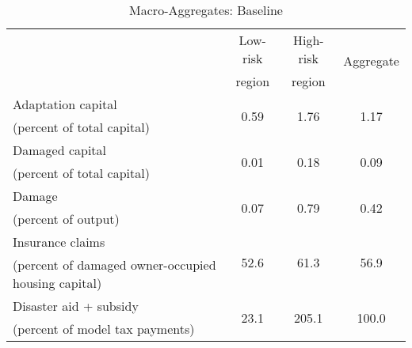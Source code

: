 \begin{table}[H] 
\singlespace 
\center 
\caption{Macro-Aggregates: Baseline} \label{tab:baseline_agg}
\vspace{-.1in} 
\begin{tabular}{l c c c}\hline 
\hline 
 	& Low-risk & High-risk & \multirow{2}{*}{Aggregate} \\[-0.75ex] 
 	& region & region &  \\ 
\hline 
Adaptation capital & \multirow{2}{*}{    0.59} & \multirow{2}{*}{    1.76} & \multirow{2}{*}{    1.17}  \\[-0.75ex](percent of total capital) \\Damaged capital & \multirow{2}{*}{    0.01} & \multirow{2}{*}{    0.18} & \multirow{2}{*}{    0.09}  \\[-0.75ex](percent of total capital) \\Damage & \multirow{2}{*}{    0.07} & \multirow{2}{*}{    0.79} & \multirow{2}{*}{    0.42}  \\[-0.75ex](percent of output) \\Insurance claims & \multirow{2}{*}{    52.6} & \multirow{2}{*}{    61.3} & \multirow{2}{*}{    56.9}  \\[-0.75ex](percent of damaged owner-occupied housing capital) \\Disaster aid + subsidy & \multirow{2}{*}{    23.1} & \multirow{2}{*}{   205.1} & \multirow{2}{*}{   100.0}  \\[-0.75ex](percent of model tax payments) \\\hline 
\end{tabular}
\end{table} 
